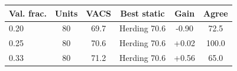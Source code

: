 \begin{tabular}{lccccc}
\toprule
Val. frac. & Units & VACS & Best static & Gain & Agree \\
\midrule
0.20 & 80 & 69.7 & Herding 70.6 & -0.90 & 72.5 \\
0.25 & 80 & 70.6 & Herding 70.6 & +0.02 & 100.0 \\
0.33 & 80 & 71.2 & Herding 70.6 & +0.56 & 65.0 \\
\bottomrule
\end{tabular}
